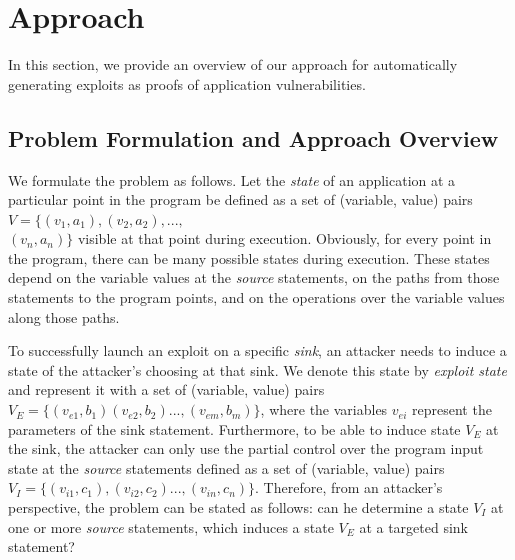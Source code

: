 \section{Approach}
\label{sec:approach}


In this section, we provide an overview of our approach for automatically generating exploits as proofs of application vulnerabilities.

\subsection{Problem Formulation and Approach Overview} We formulate the problem as follows. Let the \textit{state} of an application at a particular point in the program be defined as a set of (variable, value) pairs $V = \{(v_1, a_1), (v_2, a_2), ...,$ \\
$ (v_n, a_n)\}$ visible at that point during execution. Obviously, for every point in the program, there can be many possible states during execution. These states depend on the variable values at the \textit{source} statements, on the paths from those statements to the program points, and on the operations over the variable values along those paths.

To successfully launch an exploit on a specific \textit{sink}, an attacker needs to induce a state of the attacker's choosing at that sink. We denote this state by \textit{exploit state} and represent it with a set of (variable, value) pairs $V_E = \{(v_{e1}, b_1) (v_{e2}, b_2) ..., (v_{em}, b_m)\}$, where the variables $v_{ei}$ represent the parameters of the sink statement. Furthermore, to be able to induce state $V_E$ at the sink, the attacker can only use the partial control over the program input state at the \textit{source} statements defined as a set of (variable, value) pairs $V_I = \{(v_{i1}, c_1), (v_{i2}, c_2) ..., (v_{in}, c_n)\}$. Therefore, from an attacker's perspective, the problem can be stated as follows: can he determine a state $V_I$ at one or more \textit{source} statements, which induces a state $V_E$ at a targeted sink statement?

